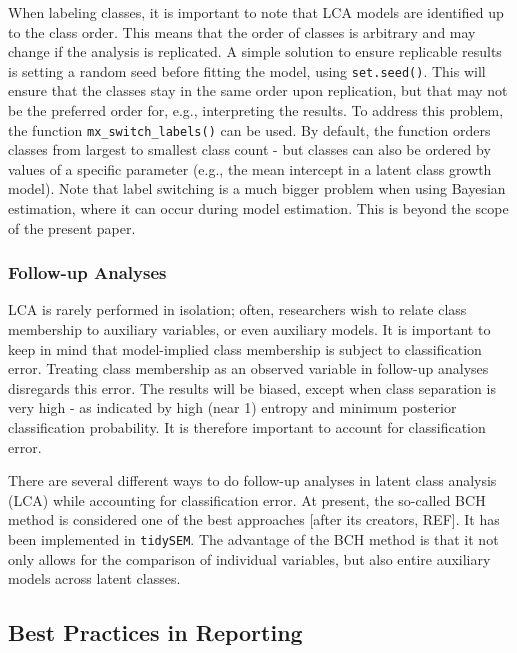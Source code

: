 \documentclass[
  ,man,floatsintext]{apa6}
\begin{document}
When labeling classes, it is important to note that LCA models are
identified up to the class order.
This
means that the order of classes is arbitrary and may change if the
analysis is replicated. A simple solution to ensure replicable results
is setting a random seed before fitting the model, using \texttt{set.seed()}.
This will ensure that the classes stay in the same order upon
replication, but that may not be the preferred order for, e.g.,
interpreting the results. To address this problem, the function
\texttt{mx\_switch\_labels()} can be used. By default, the function orders
classes from largest to smallest class count - but classes can also be
ordered by values of a specific parameter (e.g., the mean intercept in a
latent class growth model). Note that label switching is a much bigger
problem when using Bayesian estimation, where it can occur during model
estimation. This is beyond the scope of the present paper.

\hypertarget{follow-up-analyses}{%
\subsubsection{Follow-up Analyses}\label{follow-up-analyses}}

LCA is rarely performed in isolation; often, researchers wish to relate
class membership to auxiliary variables, or even auxiliary models. It is
important to keep in mind that model-implied class membership is subject
to classification error. Treating class membership as an observed
variable in follow-up analyses disregards this error. The results will
be biased, except when class separation is very high - as indicated by
high (near 1) entropy and minimum posterior classification probability.
It is therefore important to account for classification error.

There are several different ways to do follow-up analyses in latent
class analysis (LCA) while accounting for classification error. At
present, the so-called BCH method is considered one of the best
approaches {[}after its creators, REF{]}. It has been implemented in
\texttt{tidySEM}. The advantage of the BCH method is that it not only allows
for the comparison of individual variables, but also entire auxiliary
models across latent classes.

\hypertarget{best-practices-in-reporting}{%
\subsection{Best Practices in Reporting}\label{best-practices-in-reporting}}
\end{document}
